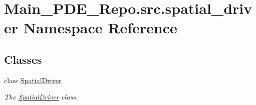 \hypertarget{namespaceMain__PDE__Repo_1_1src_1_1spatial__driver}{}\section{Main\+\_\+\+P\+D\+E\+\_\+\+Repo.\+src.\+spatial\+\_\+driver Namespace Reference}
\label{namespaceMain__PDE__Repo_1_1src_1_1spatial__driver}
\subsection*{Classes}
\begin{DoxyCompactItemize}
\item 
class \hyperlink{classMain__PDE__Repo_1_1src_1_1spatial__driver_1_1SpatialDriver}{Spatial\+Driver}
\begin{DoxyCompactList}\small\item\em The \hyperlink{classMain__PDE__Repo_1_1src_1_1spatial__driver_1_1SpatialDriver}{Spatial\+Driver} class. \end{DoxyCompactList}\end{DoxyCompactItemize}
